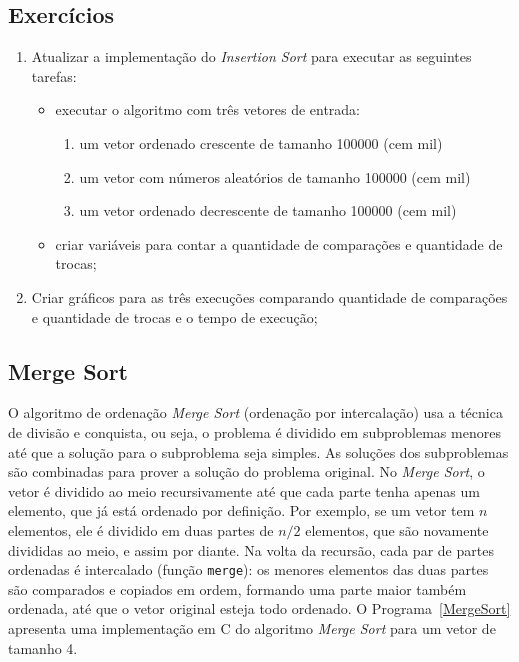 \documentclass[11pt,fleqn]{book} %
\begin{document}
\subsection*{Exercícios}
\begin{enumerate}
	\item Atualizar a implementação do \textit{Insertion Sort} para executar as seguintes tarefas:
	\begin{itemize}
		\item executar o algoritmo com três vetores de entrada:
		\begin{enumerate}
			\item um vetor ordenado crescente de tamanho 100000 (cem mil)
			\item um vetor com números aleatórios de tamanho 100000 (cem mil)
			\item um vetor ordenado decrescente de tamanho 100000 (cem mil)
		\end{enumerate} 
		\item criar variáveis para contar a quantidade de comparações e quantidade de trocas;
	\end{itemize} 
	\item Criar gráficos para as três execuções comparando quantidade de comparações e quantidade de trocas e o tempo de execução;
\end{enumerate} 
\newpage
\subsection*{Merge Sort}
O algoritmo de ordenação \textit{Merge Sort} (ordenação por intercalação) usa a técnica de divisão e conquista, ou seja, o problema é dividido em subproblemas menores até que a solução para o subproblema seja simples.
As soluções dos subproblemas são combinadas para prover a solução do problema original.
No \textit{Merge Sort}, o vetor é dividido ao meio recursivamente até que cada parte tenha apenas um elemento, que já está ordenado por definição.
Por exemplo, se um vetor tem $n$ elementos, ele é dividido em duas partes de $n/2$ elementos, que são novamente divididas ao meio, e assim por diante.
Na volta da recursão, cada par de partes ordenadas é intercalado (função \texttt{merge}): os menores elementos das duas partes são comparados e copiados em ordem, formando uma parte maior também ordenada, até que o vetor original esteja todo ordenado.
O Programa~\ref{MergeSort} apresenta uma implementação em C do algoritmo \textit{Merge Sort} para um vetor de tamanho 4.

\end{document}
